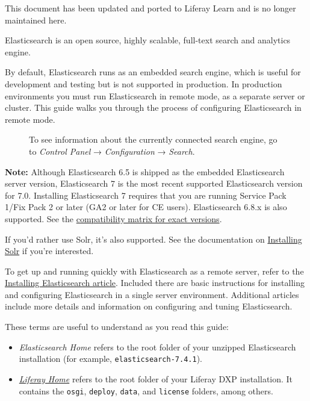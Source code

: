 {This document has been updated and ported to Liferay Learn and is no
longer maintained here.}

Elasticsearch is an open source, highly scalable, full-text search and
analytics engine.

By default, Elasticsearch runs as an embedded search engine, which is
useful for development and testing but is not supported in production.
In production environments you must run Elasticsearch in remote mode, as
a separate server or cluster. This guide walks you through the process
of configuring Elasticsearch in remote mode.

\begin{figure}
\centering
{}
\caption{To see information about the currently connected search engine,
go to \emph{Control Panel} → \emph{Configuration} → \emph{Search}.}
\end{figure}

\noindent\hrulefill

\textbf{Note:} Although Elasticsearch 6.5 is shipped as the embedded
Elasticsearch server version, Elasticsearch 7 is the most recent
supported Elasticsearch version for 7.0. Installing Elasticsearch 7
requires that you are running Service Pack 1/Fix Pack 2 or later (GA2 or
later for CE users). Elasticsearch 6.8.x is also supported. See the
\href{https://help.liferay.com/hc/en-us/articles/360016511651}{compatibility
matrix for exact versions}.

\noindent\hrulefill

If you'd rather use Solr, it's also supported. See the documentation on
\href{/docs/7-2/deploy/-/knowledge_base/d/installing-solr}{Installing
Solr} if you're interested.

To get up and running quickly with Elasticsearch as a remote server,
refer to the
\href{/docs/7-2/deploy/-/knowledge_base/d/installing-elasticsearch}{Installing
Elasticsearch article}. Included there are basic instructions for
installing and configuring Elasticsearch in a single server environment.
Additional articles include more details and information on configuring
and tuning Elasticsearch.

These terms are useful to understand as you read this guide:

\begin{itemize}
\item
  \emph{Elasticsearch Home} refers to the root folder of your unzipped
  Elasticsearch installation (for example,
  \texttt{elasticsearch-7.4.1}).
\item
  \href{/docs/7-2/deploy/-/knowledge_base/d/liferay-home}{\emph{Liferay
  Home}} refers to the root folder of your Liferay DXP installation. It
  contains the \texttt{osgi}, \texttt{deploy}, \texttt{data}, and
  \texttt{license} folders, among others.
\end{itemize}

